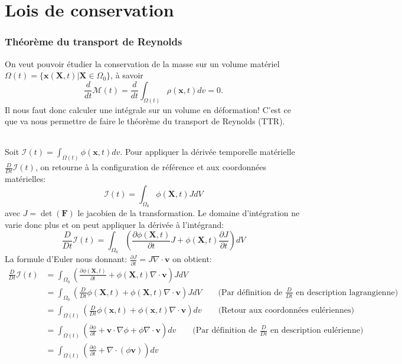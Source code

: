 \part{Lois de conservation}
\section{Théorème du transport de Reynolds}
On veut pouvoir étudier la conservation de la masse sur un volume matériel $\Omega (t)=\{\textbf{x}(\textbf{X},t)|\textbf{X}\in \Omega_0\}$, à savoir $$\frac{d}{dt}\mathcal{M}(t)=\frac{d}{dt}\int_{\Omega (t)}\rho(\textbf{x},t)dv=0.$$ Il nous faut donc calculer une intégrale sur un volume en déformation! C'est ce que va nous permettre de faire le théorème du transport de Reynolds (TTR).
\paragraph{}
Soit $\mathcal{I}(t)=\int_{\Omega (t)}\phi(\textbf{x},t)dv$. Pour appliquer la dérivée temporelle matérielle $\frac{D}{Dt}\mathcal{I}(t)$, on retourne à la configuration de référence et aux coordonnées matérielles:
$$\mathcal{I}(t)=\int_{\Omega_0}\phi(\textbf{X},t)JdV$$ avec $J=\det(\textbf{F})$ le jacobien de la transformation. Le domaine d'intégration ne varie donc plus et on peut appliquer la dérivée à l'intégrand:
$$\frac{D}{Dt}\mathcal{I}(t)=\int_{\Omega_0}\left(\frac{\partial \phi(\textbf{X},t)}{\partial t}J+\phi(\textbf{X},t)\frac{\partial J}{\partial t}\right)dV$$
La formule d'Euler nous donnant: $\frac{\partial J}{\partial t}=J\nabla\cdot\textbf{v}$ on obtient:
$$\begin{aligned}
\frac{D}{Dt}\mathcal{I}(t)&=\int_{\Omega_0}\left(\frac{\partial \phi(\textbf{X},t)}{\partial t}+\phi(\textbf{X},t)\nabla\cdot\textbf{v}\right)JdV\\
 &=\int_{\Omega_0}\left(\frac{D}{Dt}\phi(\textbf{X},t)+\phi(\textbf{X},t)\nabla\cdot\textbf{v}\right)JdV \qquad\text{(Par définition de } \frac{D}{Dt}\text{ en description lagrangienne)}\\ 
 &=\int_{\Omega (t)}\left(\frac{D}{Dt}\phi(\textbf{x},t)+\phi(\textbf{x},t)\nabla\cdot\textbf{v}\right)dv\qquad\text{(Retour aux coordonnées eulériennes) }\\
 &=\int_{\Omega (t)}\left(\frac{\partial\phi}{\partial t}+\textbf{v}\cdot\nabla\phi+\phi\nabla\cdot\textbf{v}\right)dv\qquad\text{(Par définition de } \frac{D}{Dt}\text{ en description eulérienne)}\\
 &=\int_{\Omega (t)}\left(\frac{\partial\phi}{\partial t}+\nabla\cdot(\phi\textbf{v})\right)dv
\end{aligned}$$
